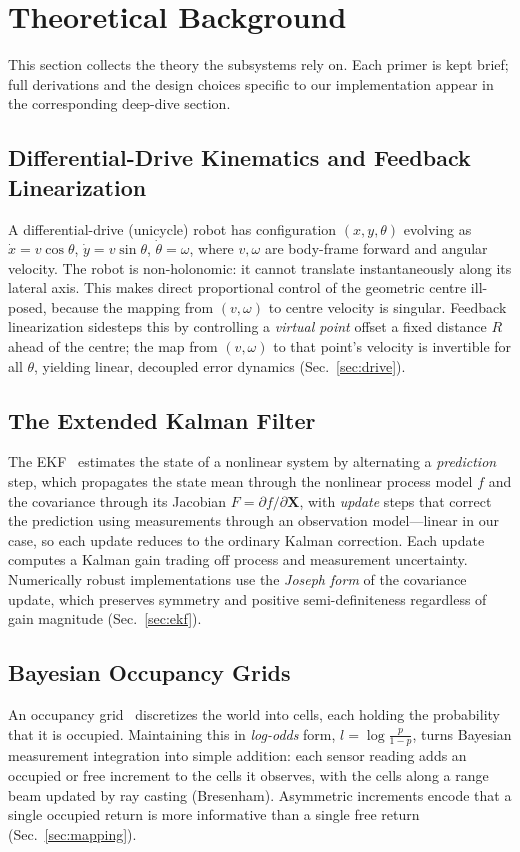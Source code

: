 \documentclass[conference]{IEEEtran}
\newcommand{\state}{\mathbf{X}}
\begin{document}
\section{Theoretical Background}
\label{sec:background}
This section collects the theory the subsystems rely on. Each primer is kept
brief; full derivations and the design choices specific to our implementation
appear in the corresponding deep-dive section.

\subsection{Differential-Drive Kinematics and Feedback Linearization}
A differential-drive (unicycle) robot has configuration $(x,y,\theta)$ evolving
as $\dot{x}=v\cos\theta$, $\dot{y}=v\sin\theta$, $\dot{\theta}=\omega$, where
$v,\omega$ are body-frame forward and angular velocity. The robot is
non-holonomic: it cannot translate instantaneously along its lateral axis. This
makes direct proportional control of the geometric centre ill-posed, because the
mapping from $(v,\omega)$ to centre velocity is singular. Feedback linearization
sidesteps this by controlling a \emph{virtual point} offset a fixed distance
$R$ ahead of the centre; the map from $(v,\omega)$ to that point's velocity is
invertible for all $\theta$, yielding linear, decoupled error dynamics
(Sec.~\ref{sec:drive}).

\subsection{The Extended Kalman Filter}
The EKF~\cite{kalman,thrun} estimates the state of a nonlinear system by alternating a
\emph{prediction} step, which propagates the state mean through the nonlinear
process model $f$ and the covariance through its Jacobian $F=\partial f/\partial
\state$, with \emph{update} steps that correct the prediction using measurements
through an observation model---linear in our case, so each update reduces to the
ordinary Kalman correction. Each update computes a Kalman
gain trading off process and measurement uncertainty. Numerically robust
implementations use the \emph{Joseph form} of the covariance update, which
preserves symmetry and positive semi-definiteness regardless of gain magnitude
(Sec.~\ref{sec:ekf}).

\subsection{Bayesian Occupancy Grids}
An occupancy grid~\cite{thrun} discretizes the world into cells, each holding the
probability that it is occupied. Maintaining this in \emph{log-odds} form,
$l=\log\frac{p}{1-p}$, turns Bayesian measurement integration into simple
addition: each sensor reading adds an occupied or free increment to the cells it
observes, with the cells along a range beam updated by ray casting (Bresenham).
Asymmetric increments encode that a single occupied return is more informative
than a single free return (Sec.~\ref{sec:mapping}).
\end{document}
